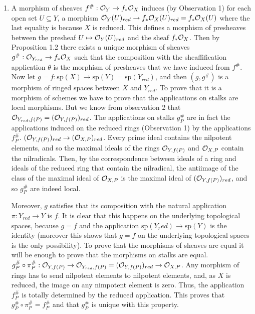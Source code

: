 \begin{sol}
\begin{enumerate}[label=\alph*)]
		\item A morphism of sheaves $f^{\#}: \mathcal{O}_Y \to f_* \mathcal{O}_X$ induces (by Observation 1) for each open set $U \subseteq Y$, a morphism $\mathcal{O}_Y(U)_{red} \to f_* \mathcal{O}_X(U)_{red} = f_* \mathcal{O}_X(U)$ where the last equality is because $X$ is reduced. This defines a morphism of presheaves between the presheaf  $U \mapsto \mathcal{O}_Y(U)_{red}$ and the sheaf $f_* \mathcal{O}_X$.
		Then by Proposition 1.2 there exists a unique morphism of sheaves $g^{\#}: \mathcal{O}_{Y_{red}} \to f_*\mathcal{O}_X$ such that the composition with the sheaffification application $\theta$ is the morphism of presheaves that we have induced from $f^{\#}$. Now let $g = f: \mathrm{sp}(X) \to \mathrm{sp}(Y) = \mathrm{sp}(Y_{red})$, and then $(g, g^{\#})$ is a morphism of ringed spaces between $X$ and $Y_{red}$. To prove that it is a morphism of schemes we have to prove that the applications on stalks are local morphisms. But we know from observation 2 that $\mathcal{O}_{Y_{red}, f(P)} = (\mathcal{O}_{Y,f(P)})_{red}$. The applications on stalks $g^{\#}_P$ are in fact the applications induced on the reduced rings (Observation 1) by the applications $f^{\#}_P$. $(\mathcal{O}_{Y,f(P)})_{red} \to (\mathcal{O}_{X,P})_{red}$. Every prime ideal contains the nilpotent elements, and so the maximal ideals of the rings $\mathcal{O}_{Y,f(P)}$ and $\mathcal{O}_{X,P}$ contain the nilradicals. Then, by the correspondence between ideals of a ring and ideals of the reduced ring that contain the nilradical, the antiimage of the class of the maximal ideal of $\mathcal{O}_{X,P}$ is the maximal ideal of $(\mathcal{O}_{Y,f(P)})_{red}$, and so $g^{\#}_P$ are indeed local.

		Moreover, $g$ satisfies that its composition with the natural application $\pi: Y_{red} \to Y$ is $f$. It is clear that this happens on the underlying topological spaces, because $g = f$ and the application $\mathrm{sp}(Y_red) \to \mathrm{sp}(Y)$ is the identity (moreover this shows that $g = f$ on the underlying topological spaces is the only possibility). To prove that the morphisms of sheaves are equal it will be enough to prove that the morphisms on stalks are equal. $g^{\#}_P \circ \pi^{\#}_P: \mathcal{O}_{Y,f(P)} \to \mathcal{O}_{Y_{red}, f(P)} = (\mathcal{O}_{Y,f(P)})_{red} \to \mathcal{O}_{X,P}$. Any morphism of rings has to send nilpotent elements to nilpotent elements, and, as $X$ is reduced, the image on any nimpotent element is zero. Thus, the application $f^{\#}_P$ is totally determined by the reduced application. This proves that $g^{\#}_P \circ \pi^{\#}_P = f_P^{\#}$ and that $g^{\#}_P$ is unique with this property.  
	\end{enumerate}
\end{sol}

